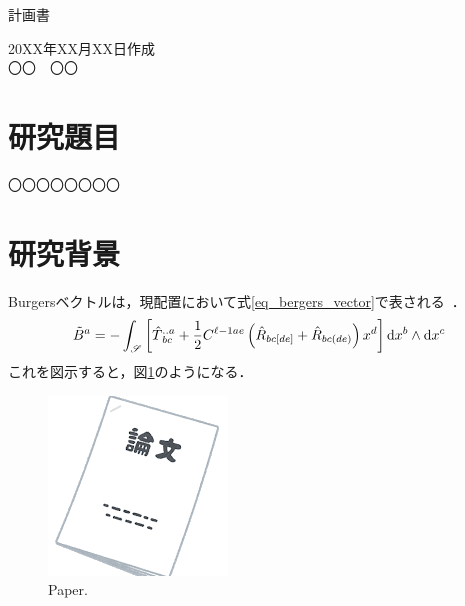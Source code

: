 \documentclass[article, paper=a4, fleqn, fontsize=10.5bp, line_length=40zw, gutter=30mm, head_space=35mm, foot_space=30mm]{jlreq}
\begin{document}
\pagestyle{empty}

\begin{center}
{計画書}
\end{center}
\vspace{0.3cm}
\begin{flushright}
{20XX年XX月XX日作成}
\\
{〇〇　〇〇}
\end{flushright}

\section{研究題目}
〇〇〇〇〇〇〇〇

\section{研究背景}
Burgersベクトルは，現配置において式\eqref{eq_bergers_vector}で表される~\cite{kondo1955non-riemannian}．
%
\begin{equation}
    \label{eq_bergers_vector}
    \tilde{B}{}^{a}
    = -\int_{\mathscr{S}} \left[ \hat{T}{}^{..a}_{bc} + \frac{1}{2} C^{\ell{}-1ae} \left( \hat{R}{}_{bc[de]} + \hat{R}{}_{bc(de)} \right) x^{d} \right] \mathrm{d} x^{b} \wedge \mathrm{d} x^{c}
    \dotfill
\end{equation}
%
これを図示すると，図\ref{fig_paper_irasutoya}のようになる．
%
\begin{figure}[bp]
    \centering
    \includegraphics{./figure/document_ronbun_taba.png}
    \caption{Paper.}
    \label{fig_paper_irasutoya}
\end{figure}
%



\end{document}

